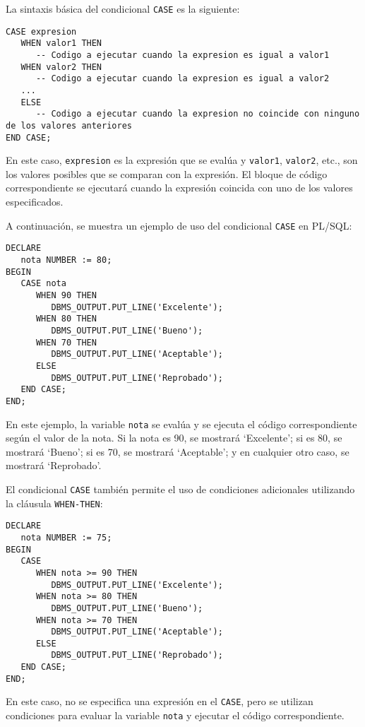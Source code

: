 \documentclass[executivepaper]{article}
\begin{document}
La sintaxis básica del condicional \texttt{CASE} es la siguiente:

\begin{lstlisting}
CASE expresion
   WHEN valor1 THEN
      -- Codigo a ejecutar cuando la expresion es igual a valor1
   WHEN valor2 THEN
      -- Codigo a ejecutar cuando la expresion es igual a valor2
   ...
   ELSE
      -- Codigo a ejecutar cuando la expresion no coincide con ninguno de los valores anteriores
END CASE;
\end{lstlisting}

En este caso, \texttt{expresion} es la expresión que se evalúa y \texttt{valor1}, \texttt{valor2}, etc., son los valores posibles que se comparan con la expresión. El bloque de código correspondiente se ejecutará cuando la expresión coincida con uno de los valores especificados.

A continuación, se muestra un ejemplo de uso del condicional \texttt{CASE} en PL/SQL:

\begin{lstlisting}
DECLARE
   nota NUMBER := 80;
BEGIN
   CASE nota
      WHEN 90 THEN
         DBMS_OUTPUT.PUT_LINE('Excelente');
      WHEN 80 THEN
         DBMS_OUTPUT.PUT_LINE('Bueno');
      WHEN 70 THEN
         DBMS_OUTPUT.PUT_LINE('Aceptable');
      ELSE
         DBMS_OUTPUT.PUT_LINE('Reprobado');
   END CASE;
END;
\end{lstlisting}

En este ejemplo, la variable \texttt{nota} se evalúa y se ejecuta el código correspondiente según el valor de la nota. Si la nota es 90, se mostrará \enquote*{Excelente}; si es 80, se mostrará \enquote*{Bueno}; si es 70, se mostrará \enquote*{Aceptable}; y en cualquier otro caso, se mostrará \enquote*{Reprobado}.

El condicional \texttt{CASE} también permite el uso de condiciones adicionales utilizando la cláusula \texttt{WHEN-THEN}:

\begin{lstlisting}
DECLARE
   nota NUMBER := 75;
BEGIN
   CASE
      WHEN nota >= 90 THEN
         DBMS_OUTPUT.PUT_LINE('Excelente');
      WHEN nota >= 80 THEN
         DBMS_OUTPUT.PUT_LINE('Bueno');
      WHEN nota >= 70 THEN
         DBMS_OUTPUT.PUT_LINE('Aceptable');
      ELSE
         DBMS_OUTPUT.PUT_LINE('Reprobado');
   END CASE;
END;
\end{lstlisting}

En este caso, no se especifica una expresión en el \texttt{CASE}, pero se utilizan condiciones para evaluar la variable \texttt{nota} y ejecutar el código correspondiente.
\end{document}
